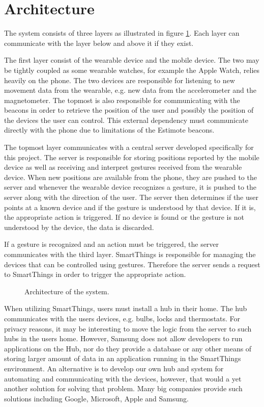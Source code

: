 \section{Architecture}

The system consists of three layers as illustrated in figure \ref{fig:architecture}. 
Each layer can communicate with the layer below and above it if they exist.

The first layer consist of the wearable device and the mobile device. 
The two may be tightly coupled as some wearable watches, for example the Apple Watch, relies heavily on the phone. 
The two devices are responsible for listening to new movement data from the wearable, e.g. new data from the accelerometer and the magnetometer. 
The topmost is also responsible for communicating with the beacons in order to retrieve the position of the user and possibly the position of the devices the user can control. 
This external dependency must communicate directly with the phone due to limitations of the Estimote beacons.

The topmost layer communicates with a central server developed specifically for this project. 
The server is responsible for storing positions reported by the mobile device as well as receiving and interpret gestures received from the wearable device.
When new positions are available from the phone, they are pushed to the server and whenever the wearable device recognizes a gesture, 
it is pushed to the server along with the direction of the user.
The server then determines if the user points at a known device and if the gesture is understood by that device. 
If it is, the appropriate action is triggered. 
If no device is found or the gesture is not understood by the device, the data is discarded.


If a gesture is recognized and an action must be triggered, the server communicates with the third layer. 
SmartThings is responsible for managing the devices that can be controlled using gestures. 
Therefore the server sends a request to SmartThings in order to trigger the appropriate action.

\begin{figure}[h]
  \centering
  
  \caption{Architecture of the system.}
  \label{fig:architecture}
\end{figure}

When utilizing SmartThings, users must install a hub in their home. 
The hub communicates with the users devices, e.g. bulbs, locks and thermostats. 
For privacy reasons, it may be interesting to move the logic from the server to such hubs in the users home. 
However, Samsung does not allow developers to run applications on the Hub, 
nor do they provide a database or any other means of storing larger amount of data in an application running in the SmartThings environment.
An alternative is to develop our own hub and system for automating and communicating with the devices, 
however, that would a yet another solution for solving that problem. 
Many big companies provide such solutions including Google, Microsoft, Apple and Samsung.

